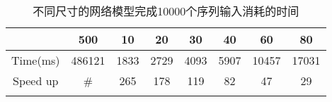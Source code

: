 \begin{center}
\begin{table}
	\caption{不同尺寸的网络模型完成10000个序列输入消耗的时间}
	\renewcommand\arraystretch{1.2}
	\setlength{\tabcolsep}{10pt}
	\begin{tabular}{cccccccc}
	\toprule
		 		&		500		&	10		&	20		&	30		&	40		&	60		&	80		\\	\midrule
	Time(ms)	&		486121	&	1833		&	2729	&	4093	&	5907	&	10457	&	17031 \\	\hline
	Speed up	&		\#		&	265		&	178		&	119		&	82		&	47		&	29 \\
	\bottomrule
	\label{tab:time}
	\end{tabular}
\end{table}
\vspace{-3em}
\end{center}
